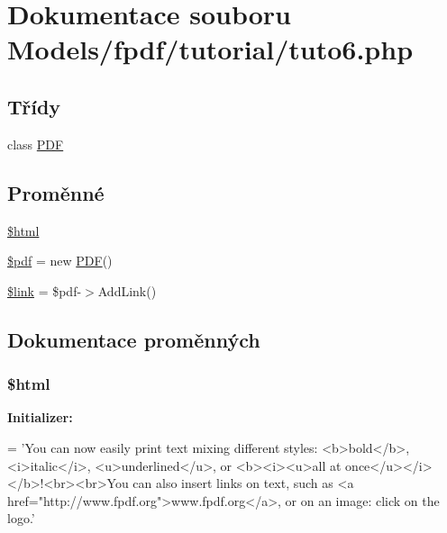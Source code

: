 \hypertarget{tuto6_8php}{\section{Dokumentace souboru Models/fpdf/tutorial/tuto6.php}
\label{tuto6_8php}
}
\subsection*{Třídy}
\begin{DoxyCompactItemize}
\item 
class \hyperlink{class_p_d_f}{P\-D\-F}
\end{DoxyCompactItemize}
\subsection*{Proměnné}
\begin{DoxyCompactItemize}
\item 
\hyperlink{tuto6_8php_a6f96e7fc92441776c9d1cd3386663b40}{\$html}
\item 
\hyperlink{tuto6_8php_a964ee5ee597c515cbb4dad2f14054cb4}{\$pdf} = new \hyperlink{class_p_d_f}{P\-D\-F}()
\item 
\hyperlink{tuto6_8php_a5d346e31b75d916e3bac9cb193bfc97f}{\$link} = \$pdf-\/$>$Add\-Link()
\end{DoxyCompactItemize}


\subsection{Dokumentace proměnných}
\hypertarget{tuto6_8php_a6f96e7fc92441776c9d1cd3386663b40}{
\subsubsection[{\$html}]{\setlength{\rightskip}{0pt plus 5cm}\$html}}\label{tuto6_8php_a6f96e7fc92441776c9d1cd3386663b40}
{\bfseries Initializer\-:}
\begin{DoxyCode}
= \textcolor{stringliteral}{'You can now easily print text mixing different styles: <b>bold</b>, <i>italic</i>,}
\textcolor{stringliteral}{<u>underlined</u>, or <b><i><u>all at once</u></i></b>!<br><br>You can also insert links on}
\textcolor{stringliteral}{text, such as <a href="http://www.fpdf.org">www.fpdf.org</a>, or on an image: click on the logo.'}
\end{DoxyCode}


